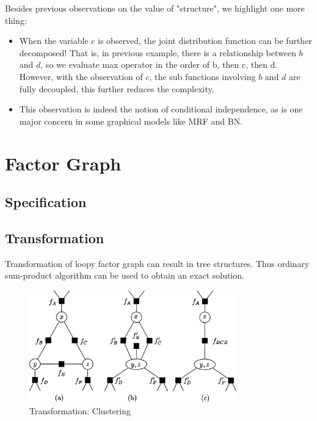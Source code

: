 \documentclass[11pt,a4paper]{article}
\begin{document}
Besides previous observations on the value of "structure", we 
highlight one more thing:
\begin{itemize}
	\item When the variable $c$ is observed, the joint distribution 
	function can be further decomposed! That is, in previous example, 
	there is a relationship between $b$ and $d$, so we evaluate max operator
	in the order of b, then c, then d. However, with the observation 
	of $c$, the sub functions involving $b$ and $d$ are fully 
	decoupled, this further reduces the complexity. 
	\item This observation is indeed the notion of 
	conditional independence, as is one major concern in 
	some graphical models like MRF and BN. 
\end{itemize}

\section{Factor Graph}

\subsection{Specification}



\subsection{Transformation}

Transformation of loopy factor graph can result in 
tree structures. Thus ordinary sum-product algorithm 
can be used to obtain an exact solution. 

\begin{figure}[htb]
\centering
	\includegraphics[width=0.8\textwidth]{fig/kschischang2001-clutering.png}
	\caption{Transformation: Clustering\cite{kschischang2001factor}}
\end{figure}	
\end{document}
